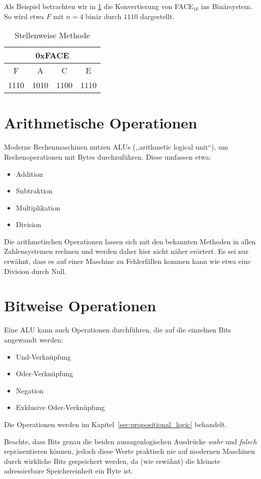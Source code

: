 Als Beispiel betrachten wir in \ref{tab:positional_approach} die
Konvertierung von FACE$_{16}$ ins Binärsystem. So wird etwa $F$
mit $n=4$ binär durch $1110$ dargestellt.
%
\begin{table}[ht]
  \begin{center}
    \begin{tabular}{cccc}
     \hline
      \multicolumn{4}{c}{0xFACE} \\
     \hline
      F & A & C & E \\
     \hline
      1110 & 1010 & 1100 & 1110 \\
     \hline
    \end{tabular}
    \caption{Stellenweise Methode}
    \label{tab:positional_approach}
  \end{center}
\end{table}

\section{Arithmetische Operationen}
%
Moderne Rechenmaschinen nutzen ALUs (,,arithmetic logical unit``),
um Rechenoperationen mit Bytes durchzuführen. Diese umfassen etwa:
%
\begin{itemize}
 \item Addition
 \item Subtraktion
 \item Multiplikation
 \item Division
\end{itemize}

Die arithmetischen Operationen lassen sich mit den bekannten
Methoden in allen Zahlensystemen rechnen und werden daher hier
nicht näher erörtert. Es sei nur erwähnt, dass es auf einer
Maschine zu Fehlerfällen kommen kann wie etwa eine Division
durch Null.

\section{Bitweise Operationen}
%
Eine ALU kann auch Operationen durchführen, die auf die einzelnen Bits
angewandt werden:
%
\begin{itemize}
 \item Und-Verknüpfung
 \item Oder-Verknüpfung
 \item Negation
 \item Exklusive Oder-Verknüpfung
\end{itemize}
%
Die Operationen werden im Kapitel~\ref{sec:propositional_logic}
behandelt.

Beachte, dass Bits genau die beiden aussagenlogischen Ausdrücke
\textsl{wahr} und \textsl{falsch} repräsentieren können, jedoch diese
Werte praktisch nie auf modernen Maschinen durch wirkliche Bits
gespeichert werden, da (wie erwähnt) die kleinste adressierbare
Speichereinheit ein Byte ist.
